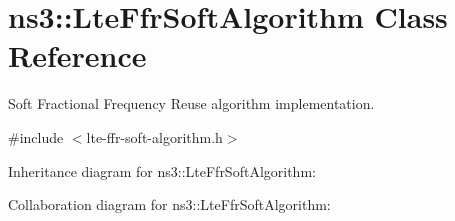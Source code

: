 \hypertarget{classns3_1_1LteFfrSoftAlgorithm}{}\section{ns3\+:\+:Lte\+Ffr\+Soft\+Algorithm Class Reference}
\label{classns3_1_1LteFfrSoftAlgorithm}


Soft Fractional Frequency Reuse algorithm implementation.  




{\ttfamily \#include $<$lte-\/ffr-\/soft-\/algorithm.\+h$>$}



Inheritance diagram for ns3\+:\+:Lte\+Ffr\+Soft\+Algorithm\+:


Collaboration diagram for ns3\+:\+:Lte\+Ffr\+Soft\+Algorithm\+:

